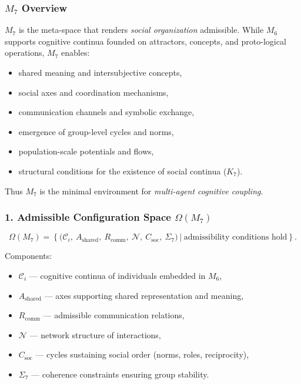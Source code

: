 

\subsubsection{\texorpdfstring{$M_7$}{M_7} Overview}
\label{sec:m7-overview}

$M_7$ is the meta-space that renders \emph{social organization} admissible.
While $M_6$ supports cognitive continua founded on attractors, concepts, and
proto-logical operations, $M_7$ enables:

\begin{itemize}
    \item shared meaning and intersubjective concepts,
    \item social axes and coordination mechanisms,
    \item communication channels and symbolic exchange,
    \item emergence of group-level cycles and norms,
    \item population-scale potentials and flows,
    \item structural conditions for the existence of social continua ($K_7$).
\end{itemize}

Thus $M_7$ is the minimal environment for \emph{multi-agent cognitive coupling}.

\subsubsection*{1. Admissible Configuration Space \texorpdfstring{$\Omega(M_7)$}{\Omega(M_7)}}

\[
\Omega(M_7)=
\left\{
\big(
\mathcal{C}_i,\
A_{\mathrm{shared}},\
R_{\mathrm{comm}},\
\mathcal{N},\
C_{\mathrm{soc}},\
\Sigma_7
\big)
\ \big| \ \text{admissibility conditions hold}
\right\}.
\]

Components:

\begin{itemize}
    \item $\mathcal{C}_i$ — cognitive continua of individuals embedded in $M_6$,
    \item $A_{\mathrm{shared}}$ — axes supporting shared representation and meaning,
    \item $R_{\mathrm{comm}}$ — admissible communication relations,
    \item $\mathcal{N}$ — network structure of interactions,
    \item $C_{\mathrm{soc}}$ — cycles sustaining social order (norms, roles, reciprocity),
    \item $\Sigma_7$ — coherence constraints ensuring group stability.
\end{itemize}

